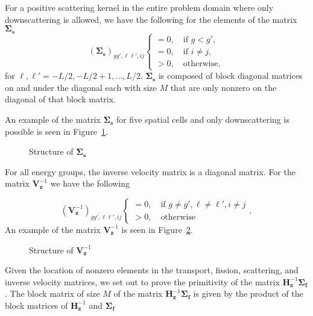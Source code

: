 \clearpage

For a positive scattering kernel in the entire problem domain where only downscattering is allowed, we have the following for the elements of the matrix $\mathbf{\Sigma_{s}}$
\begin{equation}
		(\mathbf{\Sigma_{s}})_{gg',\ell \ell', ij}
	\begin{cases}
 		= 0, \quad \text{if } g < g', \\
 		= 0, \quad \text{if } i \neq j, \\
		> 0, \quad \text{otherwise},
	\end{cases}
\end{equation}
for $\ell, \ell' = -L/2, -L/2+1, \dots, L/2$. $\mathbf{\Sigma_{s}}$ is composed of block diagonal matrices on and under the diagonal each with size $M$ that are only nonzero on the diagonal of that block matrix.

An example of the matrix $\mathbf{\Sigma_{s}}$ for five spatial cells and only downscattering is possible is seen in Figure~\ref{fig:S}.

\begin{figure}[!htbp]
	\centering
	\resizebox{0.75\textwidth}{!}{}
	\caption{Structure of $\mathbf{\Sigma_{s}}$}\label{fig:S}
\end{figure}

For all energy groups, the inverse velocity matrix is a diagonal matrix. For the matrix $\mathbf{V}_{\mathbf{z}}^{-1}$ we have the following

\begin{equation}
		(\mathbf{V}_{\mathbf{z}}^{-1})_{gg',\ell \ell', ij}
	\begin{cases}
 		= 0, \quad \text{if } g \neq g', \ell \neq \ell', i \neq j \\
		> 0, \quad \text{otherwise}
	\end{cases},
\end{equation}
An example of the matrix $\mathbf{V}_{\mathbf{z}}^{-1}$ is seen in Figure~\ref{fig:iVz}.

\begin{figure}[!htbp]
	\centering
	\resizebox{0.75\textwidth}{!}{}
	\caption{Structure of $\mathbf{V}_{\mathbf{z}}^{-1}$}\label{fig:iVz}
\end{figure}

Given the location of nonzero elements in the transport, fission, scattering, and inverse velocity matrices, we set out to prove the primitivity of the matrix $\mathbf{H}_\mathbf{z}^{-1}\mathbf{\Sigma_{f}}$. The block matrix of size $M$ of the matrix $ \mathbf{H}_{\mathbf{z}}^{-1} \mathbf{\Sigma_{f}}$ is given by the product of the block matrices of $\mathbf{H}_{\mathbf{z}}^{-1}$ and $\mathbf{\Sigma_{f}}$

